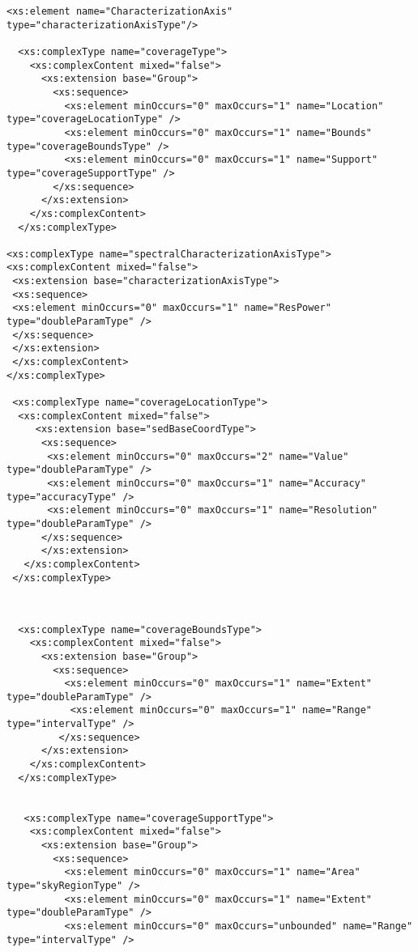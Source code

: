 {\begin{flushleft}
\begin{fmppage}
\begin{verbatim}
<xs:element name="CharacterizationAxis" type="characterizationAxisType"/>

  <xs:complexType name="coverageType">
    <xs:complexContent mixed="false">
      <xs:extension base="Group">
        <xs:sequence>
          <xs:element minOccurs="0" maxOccurs="1" name="Location" type="coverageLocationType" />
          <xs:element minOccurs="0" maxOccurs="1" name="Bounds" type="coverageBoundsType" />
          <xs:element minOccurs="0" maxOccurs="1" name="Support" type="coverageSupportType" />
        </xs:sequence>
      </xs:extension>
    </xs:complexContent>
  </xs:complexType>

<xs:complexType name="spectralCharacterizationAxisType">
<xs:complexContent mixed="false">
 <xs:extension base="characterizationAxisType">
 <xs:sequence>
 <xs:element minOccurs="0" maxOccurs="1" name="ResPower" type="doubleParamType" /> 
 </xs:sequence>
 </xs:extension>
 </xs:complexContent>
</xs:complexType>

 <xs:complexType name="coverageLocationType">
  <xs:complexContent mixed="false">
     <xs:extension base="sedBaseCoordType">
      <xs:sequence>
       <xs:element minOccurs="0" maxOccurs="2" name="Value" type="doubleParamType" />
       <xs:element minOccurs="0" maxOccurs="1" name="Accuracy" type="accuracyType" />
       <xs:element minOccurs="0" maxOccurs="1" name="Resolution" type="doubleParamType" />
      </xs:sequence>
      </xs:extension>
   </xs:complexContent>
 </xs:complexType>


\end{verbatim}
\end{fmppage}

\begin{fmppage}
\begin{verbatim}

  <xs:complexType name="coverageBoundsType">
    <xs:complexContent mixed="false">
      <xs:extension base="Group">
        <xs:sequence>
          <xs:element minOccurs="0" maxOccurs="1" name="Extent" type="doubleParamType" />
           <xs:element minOccurs="0" maxOccurs="1" name="Range" type="intervalType" />
         </xs:sequence>
      </xs:extension>
    </xs:complexContent>
  </xs:complexType>


   <xs:complexType name="coverageSupportType">
    <xs:complexContent mixed="false">
      <xs:extension base="Group">
        <xs:sequence>
          <xs:element minOccurs="0" maxOccurs="1" name="Area" type="skyRegionType" />
          <xs:element minOccurs="0" maxOccurs="1" name="Extent" type="doubleParamType" />
          <xs:element minOccurs="0" maxOccurs="unbounded" name="Range" type="intervalType" />


\end{verbatim}
\end{fmppage}
\end{flushleft}}
